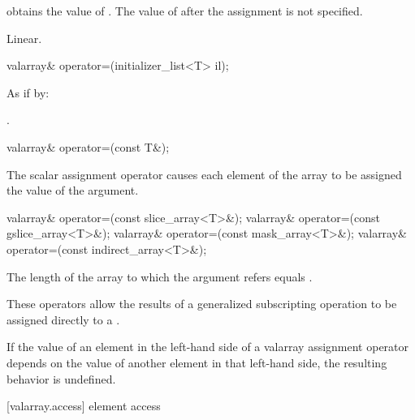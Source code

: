 \begin{itemdescr}
\pnum
\effects {} obtains the value of .
The value of  after the assignment is not specified.

\pnum
\complexity Linear.
\end{itemdescr}

%
%
\begin{itemdecl}
valarray& operator=(initializer_list<T> il);
\end{itemdecl}

\begin{itemdescr}
\pnum
\effects As if by: 

\pnum
\returns {}.
\end{itemdescr}


%
\begin{itemdecl}
valarray& operator=(const T&);
\end{itemdecl}

\begin{itemdescr}
\pnum
The scalar assignment operator causes each element of the
array to be assigned the value of the argument.
\end{itemdescr}

%
%
\begin{itemdecl}
valarray& operator=(const slice_array<T>&);
valarray& operator=(const gslice_array<T>&);
valarray& operator=(const mask_array<T>&);
valarray& operator=(const indirect_array<T>&);
\end{itemdecl}

\begin{itemdescr}
\pnum
\requires The length of the array to which the argument refers equals .

\pnum
These operators allow the results of a generalized subscripting operation
to be assigned directly to a
.

\pnum
If the value of an element in the left-hand side of a valarray assignment
operator depends on the value of another element in that left-hand side,
the resulting behavior is undefined.
\end{itemdescr}

[valarray.access]{ element access}

